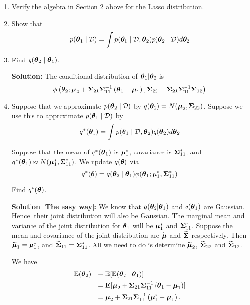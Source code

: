 \documentclass[12pt]{article}
\begin{document}
\begin{enumerate}
    \item Verify the algebra in Section 2 above for the Lasso distribution.
    
        
    \item Show that
    $$
    p({\boldsymbol \theta}_1\mid{\mathcal D}) = \int p({\boldsymbol \theta}_1\mid{\mathcal D},{\boldsymbol \theta}_2)p({\boldsymbol \theta}_2\mid{\mathcal D}) d{\boldsymbol \theta}_2
    $$
    
    \item Find $q({\boldsymbol \theta}_2\mid{\boldsymbol\theta}_1)$.
    
        
    {\bf Solution:} The conditional distribution of ${\boldsymbol \theta}_1|{\boldsymbol \theta}_2$ is
    $$
    \phi\left(
    {\boldsymbol \theta}_2;
\boldsymbol\mu_2 + \boldsymbol\Sigma_{21} \boldsymbol\Sigma_{11}^{-1}
\left(
 {\boldsymbol \theta}_1 - \boldsymbol\mu_1
\right),
{\boldsymbol {\Sigma }}_{22}-{\boldsymbol {\Sigma }}_{21}{\boldsymbol {\Sigma }}_{11}^{-1}{\boldsymbol {\Sigma }}_{12}\right)
    $$
    
    \item Suppose that we approximate $p({\boldsymbol \theta}_2\mid{\mathcal D})$ by $q({\boldsymbol \theta}_2) = N({\boldsymbol \mu}_2,{\boldsymbol \Sigma}_{22})$. Suppose we use this to approximate 
    $p({\boldsymbol \theta}_1\mid{\mathcal D})$ by
    $$
    q^*({\boldsymbol \theta}_1) = \int p({\boldsymbol \theta}_1\mid{\mathcal D},{\boldsymbol \theta}_2)q({\boldsymbol \theta}_2)  d{\boldsymbol \theta}_2
    $$
    
    \noindent Suppose that the mean of $q^*({\boldsymbol \theta}_1)$ is ${\boldsymbol \mu}_1^*$, covariance is ${\boldsymbol \Sigma}_{11}^*$, and $q^*({\boldsymbol \theta}_1) \approx N({\boldsymbol \mu}_1^*,{\boldsymbol \Sigma}_{11}^*)$.
    We update $q({\boldsymbol \theta})$ via
    $$
    q^*({\boldsymbol \theta}) = q({\boldsymbol \theta}_2\mid{\boldsymbol\theta}_1) \phi({\boldsymbol \theta}_1;{\boldsymbol \mu}_1^*,{\boldsymbol \Sigma}_{11}^*)
    $$
    
    \noindent Find $q^*({\boldsymbol \theta})$.
    
    \newpage 
    
    {\bf Solution [The easy way]:} We know that $q({\boldsymbol \theta}_2|{\boldsymbol \theta}_1)$ and $q({\boldsymbol \theta}_1)$ are Gaussian. Hence, their joint distribution will also be Gaussian. The marginal 
    mean and variance of the joint distribution for ${\boldsymbol \theta}_1$ will be ${\boldsymbol \mu}_1^*$
    and ${\boldsymbol \Sigma}_{11}^*$. Suppose the mean and covariance of the joint distribution
    are $\widetilde{{\boldsymbol \mu}}$ and $\widetilde{{\boldsymbol \Sigma}}$ respectively. Then
    $\widetilde{{\boldsymbol \mu}}_1 = {\boldsymbol \mu}_1^*$, and $\widetilde{{\boldsymbol \Sigma}}_{11} = {\boldsymbol \Sigma}_{11}^*$.
    All we need to do is determine $\widetilde{{\boldsymbol \mu}}_{2}$, $\widetilde{{\boldsymbol \Sigma}}_{22}$
    and $\widetilde{{\boldsymbol \Sigma}}_{12}$.
    
    \bigskip 
    \noindent We have
    $$
    \begin{array}{rl}
    {\mathbb E}({\boldsymbol \theta}_2) 
    & \displaystyle = {\mathbb E}[{\mathbb E}({\boldsymbol \theta}_2\mid{\boldsymbol\theta}_1)] 
    \\ [1ex]
    & \displaystyle = {\bf E}[{\boldsymbol \mu}_2 + {\boldsymbol \Sigma}_{21}{\boldsymbol \Sigma}_{11}^{-1}\left({\boldsymbol \theta}_1 - {\boldsymbol \mu}_1\right)]
    \\ [1ex]
    & \displaystyle = {\boldsymbol \mu}_2 + {\boldsymbol \Sigma}_{21}{\boldsymbol \Sigma}_{11}^{-1}\left({\boldsymbol \mu}_1^* - {\boldsymbol \mu}_1\right).
    \end{array} 
    $$
    

\end{enumerate}
\end{document}

